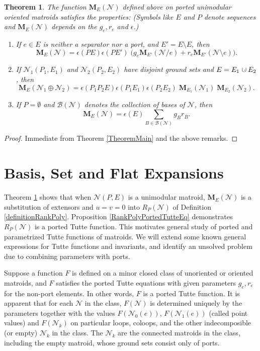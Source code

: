 \documentclass[12pt]{article}
\newtheorem{theorem}{Theorem}[section]
\theoremstyle{definition}
\newcommand{\dunion}
{\mbox{\hbox{\hskip6pt$\cdot$\hskip-5.50pt$\cup$\hskip2pt}}}
\newcommand{\scomp}[1]{\ensuremath{\overline{#1}}}
\newcommand{\ext}[1]{\ensuremath{\mathbf{#1}}}
\begin{document}
\begin{theorem}
\label{EquationsExtFunMatroids}
The function $\ext{M}_E(\mathcal{N})$ defined above 
on ported unimodular oriented matroids satisfies the 
properties:  (Symbols like $E$ and $P$ 
denote sequences and $\ext{M}_E(\mathcal{N})$ 
depends on the $g_e, r_e$ and $\epsilon$.)
\begin{enumerate}
\item If $e\in E$ is neither a separator nor a port, and $E'=E\setminus E$,  
then
\[
\ext{M}_E(\mathcal{N})=\epsilon(PE)\epsilon(PE')\;
\big(g_e\ext{M}_{E'}(\mathcal{N}/e) + r_e \ext{M}_{E'}(\mathcal{N}\setminus e)\big).
\]
\item If 
$\mathcal{N}_1(P_1,E_1)$ and $\mathcal{N}_2(P_2,E_2)$ have 
disjoint ground sets and $E=E_1\dunion E_2$, then
\[
\ext{M}_E(\mathcal{N}_1\oplus\mathcal{N}_2)=
\epsilon(P_1P_2E)\epsilon(P_1E_1)\epsilon(P_2E_2)\;
\ext{M}_{E_1}(\mathcal{N}_1)\;\ext{M}_{E_2}(\mathcal{N}_2).
\]
\item If $P=\emptyset$ and  
$\mathcal{B}(\mathcal{N})$ denotes the collection of bases of 
$\mathcal{N}$, then
\[
\ext{M}_E(\mathcal{N})=\epsilon(E)\sum_{B\in\mathcal{B}(\mathcal{N})}g_Br_{\scomp{B}}.
\]

\end{enumerate}
\end{theorem}
\begin{proof}
Immediate from Theorem \ref{TheoremMain} and the above
remarks.
\end{proof}

\section{Basis, Set and Flat Expansions}
\label{Activity}

Theorem \ref{EquationsExtFunMatroids} shows 
that when $\mathcal{N}(P,E)$ is a unimodular matroid,
$\ext{M}_E(\mathcal{N})$ 
is a substitution of extensors
and $u=v=0$ into
$R_P(\mathcal{N})$ of Definition \ref{definitionRankPoly}.
Proposition \ref{RankPolyPortedTutteEq} demonstrates $R_P(\mathcal{N})$
is a ported Tutte function.
This motivates general study of ported and parametrized 
Tutte functions of matroids.  We will extend some
known general expressions for Tutte functions and invariants,
and identify an unsolved problem due to 
combining parameters with ports.

Suppose a function $F$ is defined on a minor closed
class of unoriented or oriented matroids, and $F$ 
satisfies the ported Tutte equations with given parameters $g_e,r_e$
for the non-port elements.  
In other words, $F$ is a ported Tutte function.
It is apparent that
for each $\mathcal{N}$ in the class, $F(\mathcal{N})$  
is determined uniquely by the parameters together with
the values $F(\mathcal{N}_0(e))$, 
$F(\mathcal{N}_1(e))$ (called point values) and $F(\mathcal{N}_k)$
on particular loops, coloops, and 
the other indecomposible (or empty) $\mathcal{N}_k$ in the
class.
The $\mathcal{N}_k$ are the 
connected matroids in the class, including the empty
matroid, whose ground sets consist only of ports.
\end{document}

